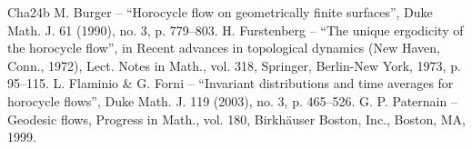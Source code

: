 \begin{thebibliography}{Cha24b}
 M. Burger – “Horocycle flow on geometrically finite surfaces”, Duke Math. J. 61 (1990), no. 3, p. 779–803.
 H. Furstenberg – “The unique ergodicity of the horocycle flow”, in Recent advances in topological dynamics (New Haven, Conn., 1972), Lect. Notes in Math., vol. 318, Springer, Berlin-New York, 1973, p. 95–115.
 L. Flaminio \& G. Forni – “Invariant distributions and time averages for horocycle flows”, Duke Math. J. 119 (2003), no. 3, p. 465–526.
 G. P. Paternain – Geodesic flows, Progress in Math., vol. 180, Birkhäuser Boston, Inc., Boston, MA, 1999.
\end{thebibliography}
